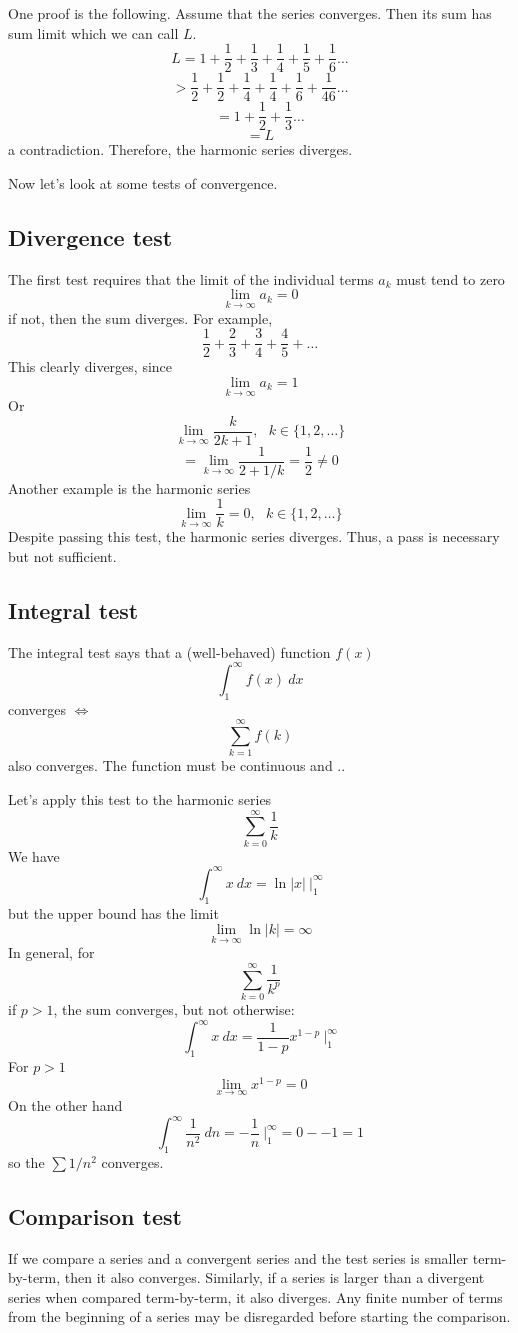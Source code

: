 \documentclass[11pt, oneside]{article}   	%
\begin{document}
One proof is the following.  Assume that the series converges.  Then its sum has sum limit which we can call $L$.
\[ L = 1 + \frac{1}{2} + \frac{1}{3} + \frac{1}{4} +  \frac{1}{5} +  \frac{1}{6} \dots \]
\[ > \frac{1}{2} + \frac{1}{2} + \frac{1}{4} + \frac{1}{4} +  \frac{1}{6} +  \frac{1}{46}  \dots \]
\[ = 1 + \frac{1}{2} + \frac{1}{3} \dots \]
\[ = L \]
a contradiction.  Therefore, the harmonic series diverges.

Now let's look at some tests of convergence.

\subsection*{Divergence test}
The first test requires that the limit of the individual terms $a_k$ must tend to zero
\[ \lim_{k \rightarrow \infty} a_k = 0 \]
if not, then the sum diverges.  For example,
\[ \frac{1}{2} + \frac{2}{3} + \frac{3}{4} + \frac{4}{5} + \dots \]
This clearly diverges, since
\[ \lim_{k \rightarrow \infty} a_k = 1 \]
Or
\[ \lim_{k \rightarrow \infty} \frac{k}{2k + 1}, \ \ \ k \in \{1,2,\dots\} \]
\[ = \lim_{k \rightarrow \infty} \frac{1}{2 + 1/k} = \frac{1}{2} \ne 0 \]
Another example is the harmonic series
\[ \lim_{k \rightarrow \infty} \frac{1}{k} = 0, \ \ \ k \in \{1,2,\dots\} \]
Despite passing this test, the harmonic series diverges.  Thus, a pass is necessary but not sufficient.

\subsection*{Integral test}
The integral test says that a (well-behaved) function $f(x)$
\[ \int_1^{\infty} f(x) \ dx \]
converges $\iff$
\[ \sum_{k=1}^{\infty} f(k) \]
also converges.  The function must be continuous and ..

Let's apply this test to the harmonic series
\[ \sum_{k=0}^{\infty} \frac{1}{k} \]
We have
\[ \int_1^{\infty} x \ dx = \ln |x| \ \bigg |_1^{\infty} \]
but the upper bound has the limit
\[ \lim_{k \rightarrow \infty} \ln |k| = \infty \]
In general, for
\[ \sum_{k=0}^{\infty} \frac{1}{k^p} \]
if $p>1$, the sum converges, but not otherwise:
\[ \int_1^{\infty} x \ dx = \frac{1}{1-p}x^{1-p} \ \bigg |_1^{\infty} \]
For $p>1$
\[ \lim_{x \rightarrow \infty} x^{1-p} = 0 \]
On the other hand
\[ \int_1^{\infty} \frac{1}{n^2} \ dn = - \frac{1}{n} \ \bigg |_1^{\infty} = 0 - - 1 = 1 \]
so the $\sum 1/n^2$ converges.

\subsection*{Comparison test}
If we compare a series and a convergent series and the test series is smaller term-by-term, then it also converges.  Similarly, if a series is larger than a divergent series when compared term-by-term, it also diverges.  Any finite number of terms from the beginning of a series may be disregarded before starting the comparison.
\end{document}
